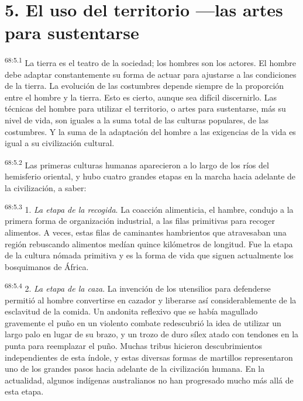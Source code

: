 \documentclass[twoside, 11pt]{book}
\begin{document}
\section*{5. El uso del territorio ---las artes para sustentarse}
\par
\textsuperscript{68:5.1} La tierra es el teatro de la sociedad; los hombres son los actores. El hombre debe adaptar constantemente su forma de actuar para ajustarse a las condiciones de la tierra. La evolución de las costumbres depende siempre de la proporción entre el hombre y la tierra. Esto es cierto, aunque sea difícil discernirlo. Las técnicas del hombre para utilizar el territorio, o artes para sustentarse, más su nivel de vida, son iguales a la suma total de las culturas populares, de las costumbres. Y la suma de la adaptación del hombre a las exigencias de la vida es igual a su civilización cultural.

\par
\textsuperscript{68:5.2} Las primeras culturas humanas aparecieron a lo largo de los ríos del hemisferio oriental, y hubo cuatro grandes etapas en la marcha hacia adelante de la civilización, a saber:

\par
\textsuperscript{68:5.3} 1. \textit{La etapa de la recogida}. La coacción alimenticia, el hambre, condujo a la primera forma de organización industrial, a las filas primitivas para recoger alimentos. A veces, estas filas de caminantes hambrientos que atravesaban una región rebuscando alimentos medían quince kilómetros de longitud. Fue la etapa de la cultura nómada primitiva y es la forma de vida que siguen actualmente los bosquimanos de África.

\par
\textsuperscript{68:5.4} 2. \textit{La etapa de la caza}. La invención de los utensilios para defenderse permitió al hombre convertirse en cazador y liberarse así considerablemente de la esclavitud de la comida. Un andonita reflexivo que se había magullado gravemente el puño en un violento combate redescubrió la idea de utilizar un largo palo en lugar de su brazo, y un trozo de duro sílex atado con tendones en la punta para reemplazar el puño. Muchas tribus hicieron descubrimientos independientes de esta índole, y estas diversas formas de martillos representaron uno de los grandes pasos hacia adelante de la civilización humana. En la actualidad, algunos indígenas australianos no han progresado mucho más allá de esta etapa.
\end{document}

